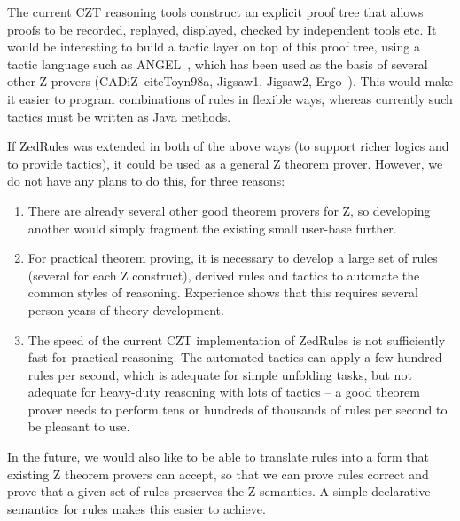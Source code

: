 \documentclass{entcs}
\begin{document}
The current CZT reasoning tools construct an explicit proof tree that
allows proofs to be recorded, replayed, displayed, checked by independent
tools etc.
It would be interesting to build a tactic layer on top of this proof
tree, using a tactic language such as ANGEL~\cite{martin:tactics}, which
has been used as the basis of several other Z provers
(CADiZ~cite{Toyn98a}, Jigsaw1, Jigsaw2,
Ergo~\cite{martin:tac-lang-for-ergo}).
This would make it easier to program combinations of rules 
in flexible ways, whereas currently such tactics must be written as
Java methods.

If ZedRules was extended in both of the above ways (to support richer
logics and to provide tactics), it could be used as a general Z theorem
prover.  However, we do not have any plans to do this, for three reasons:
\begin{enumerate}
\item There are already several other good theorem provers for Z, so
  developing another would simply fragment the existing small user-base
  further.
\item For practical theorem proving, it is necessary to develop a large set
  of rules (several for each Z construct), derived rules and tactics to
  automate the common styles of reasoning.  Experience shows that this
  requires several person years of theory development. 
\item The speed of the current CZT implementation of ZedRules is not
  sufficiently fast for practical reasoning.  The automated tactics can
  apply a few hundred rules per second, which is adequate for simple unfolding
  tasks, but not adequate for heavy-duty reasoning with lots of tactics --
  a good theorem prover needs to perform tens or hundreds of thousands of
  rules per second to be pleasant to use.
\end{enumerate}

In the future, we would also like to be able to translate rules
into a form that existing Z theorem provers can accept, so that we can prove
rules correct and prove that a given set of rules preserves the Z
semantics.  A simple declarative semantics for rules makes this
easier to achieve.



\end{document}
